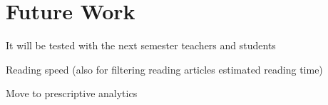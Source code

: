 \chapter{Future Work}

It will be tested with the next semester teachers and students

Reading speed (also for filtering reading articles estimated reading time)

Move to prescriptive analytics

